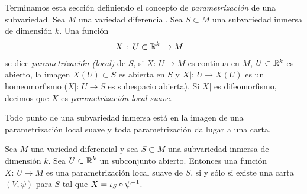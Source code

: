 Terminamos esta secci\'{o}n definiendo el concepto de
\emph{parametrizaci\'{o}n} de una subvariedad. Sea $M$ una variedad
diferencial. Sea $S\subset M$ una subvariedad inmersa de dimensi\'{o}n $k$.
Una funci\'{o}n
\begin{align*}
	X & \,:\,U\subset\bb{R}^{k}\,\rightarrow M
\end{align*}
%
se dice \emph{parametrizaci\'{o}n (local)} de $S$, si $X:\,U\rightarrow M$
es continua en $M$, $U\subset\bb{R}^{k}$ es abierto, la imagen $X(U)\subset S$
es abierta en $S$ y $X|:\,U\rightarrow X(U)$ es un homeomorfismo
($X|:\,U\rightarrow S$ es subespacio abierta). Si $X|$ es difeomorfismo,
decimos que $X$ es \emph{parametrizaci\'{o}n local suave}.

Todo punto de una subvariedad inmersa est\'{a} en la imagen de una
parametrizaci\'{o}n local suave y toda parametrizaci\'{o}n da lugar a una
carta.

\begin{propoDeLasParametrizaciones}\label{thm:delasparametrizaciones}
	Sea $M$ una variedad diferencial y sea $S\subset M$ una
	subvariedad inmersa de dimensi\'{o}n $k$. Sea $U\subset\bb{R}^{k}$
	un subconjunto abierto. Entonces una funci\'{o}n $X:\,U\rightarrow M$
	es una parametrizaci\'{o}n local suave de $S$, si y s\'{o}lo si
	existe una carta $(V,\psi)$ para $S$ tal que $X=\inc[S]\circ\psi^{-1}$.
\end{propoDeLasParametrizaciones}

